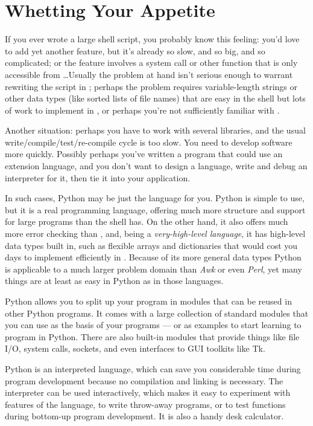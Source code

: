 \documentclass{manual}
\begin{document}
\tableofcontents


\chapter{Whetting Your Appetite}

\label{intro}

If you ever wrote a large shell script, you probably know this
feeling: you'd love to add yet another feature, but it's already so
slow, and so big, and so complicated; or the feature involves a system
call or other function that is only accessible from \C{} \ldots Usually
the problem at hand isn't serious enough to warrant rewriting the
script in \C{}; perhaps the problem requires variable-length strings or
other data types (like sorted lists of file names) that are easy in
the shell but lots of work to implement in \C{}, or perhaps you're not
sufficiently familiar with \C{}.

Another situation: perhaps you have to work with several \C{} libraries,
and the usual \C{} write/compile/test/re-compile cycle is too slow.  You
need to develop software more quickly.  Possibly perhaps you've
written a program that could use an extension language, and you don't
want to design a language, write and debug an interpreter for it, then
tie it into your application.

In such cases, Python may be just the language for you.  Python is
simple to use, but it is a real programming language, offering much
more structure and support for large programs than the shell has.  On
the other hand, it also offers much more error checking than \C{}, and,
being a \emph{very-high-level language}, it has high-level data types
built in, such as flexible arrays and dictionaries that would cost you
days to implement efficiently in \C{}.  Because of its more general data
types Python is applicable to a much larger problem domain than
\emph{Awk} or even \emph{Perl}, yet many things are at least as easy
in Python as in those languages.

Python allows you to split up your program in modules that can be
reused in other Python programs.  It comes with a large collection of
standard modules that you can use as the basis of your programs --- or
as examples to start learning to program in Python.  There are also
built-in modules that provide things like file I/O, system calls,
sockets, and even interfaces to GUI toolkits like Tk.  

Python is an interpreted language, which can save you considerable time
during program development because no compilation and linking is
necessary.  The interpreter can be used interactively, which makes it
easy to experiment with features of the language, to write throw-away
programs, or to test functions during bottom-up program development.
It is also a handy desk calculator.
\end{document}
